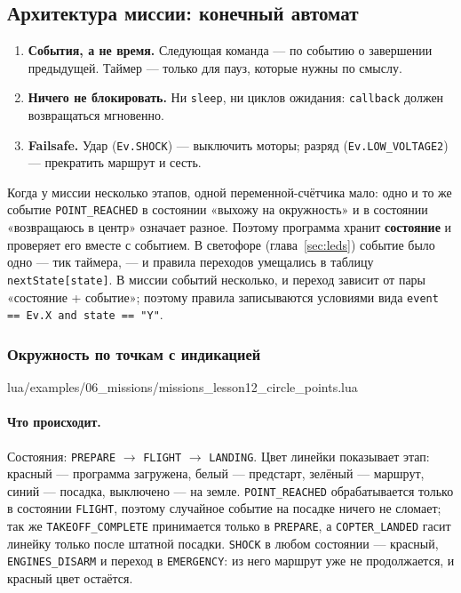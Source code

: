 \subsection{Архитектура миссии: конечный автомат}
\label{sec:missions-architecture}

\begin{infobox}
\begin{enumerate}
    \item \textbf{События, а не время.} Следующая команда --- по событию о завершении предыдущей. Таймер --- только для пауз, которые нужны по смыслу.
    \item \textbf{Ничего не блокировать.} Ни \verb|sleep|, ни циклов ожидания: \verb|callback| должен возвращаться мгновенно.
    \item \textbf{Failsafe.} Удар (\verb|Ev.SHOCK|) --- выключить моторы; разряд (\verb|Ev.LOW_VOLTAGE2|) --- прекратить маршрут и сесть.
\end{enumerate}
\end{infobox}

Когда у миссии несколько этапов, одной переменной-счётчика мало: одно и то же событие \verb|POINT_REACHED| в состоянии «выхожу на окружность» и в состоянии «возвращаюсь в центр» означает разное. Поэтому программа хранит \textbf{состояние} и проверяет его вместе с событием. В светофоре (глава~\ref{sec:leds}) событие было одно --- тик таймера, --- и правила переходов умещались в таблицу \verb|nextState[state]|. В миссии событий несколько, и переход зависит от пары «состояние + событие»; поэтому правила записываются условиями вида \verb|event == Ev.X and state == "Y"|.

\subsubsection*{Окружность по точкам с индикацией}

\begin{codefile}{lua/examples/06_missions/missions_lesson12_circle_points.lua}
\end{codefile}

\paragraph{Что происходит.} Состояния: \verb|PREPARE| $\to$ \verb|FLIGHT| $\to$ \verb|LANDING|. Цвет линейки показывает этап: красный --- программа загружена, белый --- предстарт, зелёный --- маршрут, синий --- посадка, выключено --- на земле. \verb|POINT_REACHED| обрабатывается только в состоянии \verb|FLIGHT|, поэтому случайное событие на посадке ничего не сломает; так же \verb|TAKEOFF_COMPLETE| принимается только в \verb|PREPARE|, а \verb|COPTER_LANDED| гасит линейку только после штатной посадки. \verb|SHOCK| в любом состоянии --- красный, \verb|ENGINES_DISARM| и переход в \verb|EMERGENCY|: из него маршрут уже не продолжается, и красный цвет остаётся.

